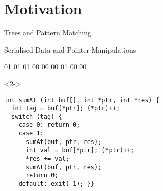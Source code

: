 
\section{Motivation}

\newcommand{\mknode}[3]{\draw (#1,#2)  circle (.27cm) node[align=center] {\IdrisData{#3}};}
\newcommand{\mkleaf}[2]{\draw[fill=black] (#1,#2) node[align=center] {} +(-.1cm,-.1cm) rectangle +(.1cm,.1cm);}

\begin{frame}{Trees and Pattern Matching}
\begin{minipage}{.5\textwidth}
\end{minipage}\hfill
\begin{minipage}{.45\textwidth}
\end{minipage}
\end{frame}

\begin{frame}[fragile]{Serialised Data and Pointer Manipulations}
\begin{hexdump}
01 01 01 00  00  00  01 00  00
\end{hexdump}
\begin{overlayarea}{\linewidth}{6cm}
\begin{onlyenv}<2->
\begin{lstlisting}
int sumAt (int buf[], int *ptr, int *res) {
  int tag = buf[*ptr]; (*ptr)++;
  switch (tag) {
    case 0: return 0;
    case 1:
      sumAt(buf, ptr, res);
      int val = buf[*ptr]; (*ptr)++;
      *res += val;
      sumAt(buf, ptr, res);
      return 0;
    default: exit(-1); }}
\end{lstlisting}
\end{onlyenv}
\end{overlayarea}
\end{frame}

